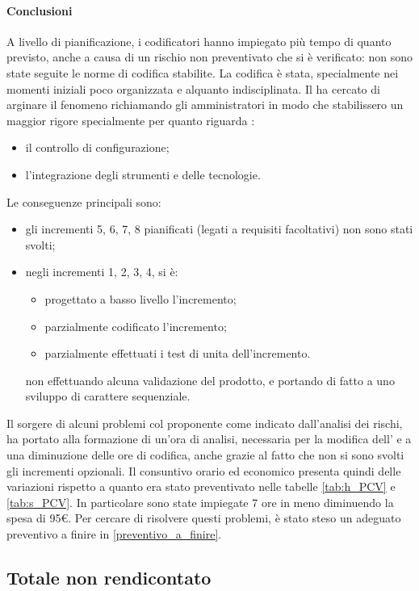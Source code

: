 	\paragraph{Conclusioni}
	A livello di pianificazione, i codificatori hanno impiegato più tempo di quanto previsto, anche a causa di un rischio non preventivato che si è verificato: non sono state seguite le norme di codifica stabilite. La codifica è stata, specialmente nei momenti iniziali poco organizzata e alquanto indisciplinata. Il \responsabile{} ha cercato di arginare il fenomeno richiamando gli amministratori in modo che stabilissero un maggior rigore specialmente per quanto riguarda :
	\begin{itemize}
		\item il controllo di configurazione;
		\item l'integrazione degli strumenti e delle tecnologie.
	\end{itemize}
	Le conseguenze principali sono:
	\begin{itemize}
		\item gli incrementi 5, 6, 7, 8 pianificati (legati a requisiti facoltativi) non sono stati svolti;
		\item negli incrementi 1, 2, 3, 4, si è:
				\begin{itemize}
					\item progettato a basso livello l'incremento;
					\item parzialmente codificato l'incremento;
					\item parzialmente effettuati i test di unita dell'incremento.
				\end{itemize}
			non effettuando alcuna validazione del prodotto, e portando di fatto a uno sviluppo di carattere sequenziale.
	\end{itemize}
	Il sorgere di alcuni problemi col proponente come indicato dall'analisi dei rischi, ha portato alla formazione di un'ora di analisi, necessaria per la modifica dell' \adr{} e a una diminuzione delle ore di codifica, anche grazie al fatto che non si sono svolti gli incrementi opzionali.
	Il consuntivo orario ed economico presenta quindi delle variazioni rispetto a quanto era stato preventivato nelle tabelle \ref{tab:h_PCV} e \ref{tab:s_PCV}. In particolare sono state impiegate 7 ore in meno diminuendo la spesa di 95€.
	Per cercare di risolvere questi problemi, è stato steso un adeguato preventivo a finire in  \ref{preventivo_a_finire}.
	\newpage
	\subsection{Totale non rendicontato}
